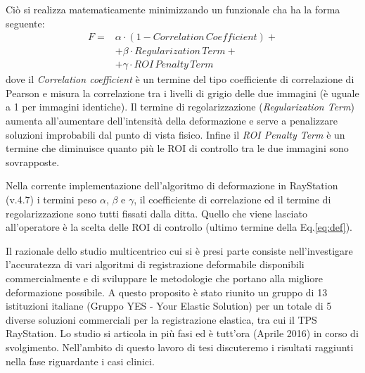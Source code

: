 Ciò si realizza matematicamente minimizzando un funzionale cha ha la forma seguente:
\begin{equation}
\label{eq:def}
\begin{split}
F =& \alpha \cdot (1- Correlation\, Coefficient) + \\
   & + \beta \cdot Regularization\,Term + \\
   & + \gamma \cdot ROI\,Penalty\,Term
\end{split}
\end{equation}
dove il \textit{Correlation coefficient} è un termine del tipo coefficiente di correlazione di Pearson e misura la correlazione tra i livelli di grigio delle due immagini (è uguale a 1 per immagini identiche). Il termine di regolarizzazione (\textit{Regularization Term}) aumenta all'aumentare dell'intensità della deformazione e serve a penalizzare soluzioni improbabili dal punto di vista fisico. Infine il \textit{ROI Penalty Term} è un termine che diminuisce quanto più le ROI di controllo tra le due immagini sono sovrapposte.

Nella corrente implementazione dell'algoritmo di deformazione in RayStation (v.4.7) i termini peso $\alpha$, $\beta$ e $\gamma$, il coefficiente di correlazione ed il termine di regolarizzazione sono tutti fissati dalla ditta. Quello che viene lasciato all'operatore è la scelta delle ROI di controllo (ultimo termine della Eq.\eqref{eq:def}).

Il razionale dello studio multicentrico cui si è presi parte consiste nell'investigare l'accuratezza di vari algoritmi di registrazione deformabile disponibili commercialmente e di sviluppare le metodologie che portano alla migliore deformazione possibile. A questo proposito è stato riunito un gruppo di 13 istituzioni italiane (Gruppo YES - Your Elastic Solution) per un totale di 5 diverse soluzioni commerciali per la registrazione elastica, tra cui il TPS RayStation. Lo studio si articola in più fasi ed è tutt'ora (Aprile 2016) in corso di svolgimento. Nell'ambito di questo lavoro di tesi discuteremo i risultati raggiunti nella fase riguardante i casi clinici.

